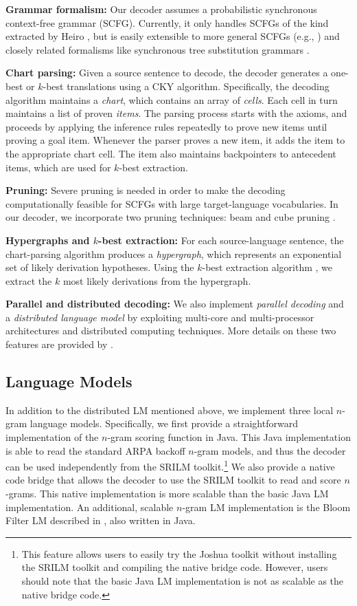 \documentclass[11pt]{article}
\begin{document}
\textbf{Grammar formalism:} Our decoder assumes a probabilistic synchronous context-free grammar (SCFG). Currently, it only handles SCFGs of the kind extracted by Heiro \cite{Chiang2007}, but is easily extensible to more general SCFGs (e.g., \cite{Galley2006}) and closely related formalisms like synchronous tree substitution grammars \cite{Eisner2003}.


\textbf{Chart parsing:} Given a source sentence to decode, the decoder generates a one-best or $k$-best translations using a CKY algorithm. Specifically,
the decoding algorithm  maintains a \emph{chart}, which contains an array of \emph{cells}. Each cell in turn maintains a list of proven \emph{items}. The parsing process starts with the axioms, and proceeds by applying the inference rules repeatedly to prove new items until proving a goal item. Whenever the parser proves a new item, it adds the item to the appropriate chart cell. The item also maintains backpointers to antecedent items, which are used for $k$-best extraction.

\textbf{Pruning:} Severe pruning is needed in order to make the decoding computationally feasible for SCFGs with large target-language vocabularies. In our decoder, we incorporate two pruning techniques: beam and cube pruning \cite{Chiang2007}.

\textbf{Hypergraphs and $k$-best extraction:}
For each source-language sentence, the chart-parsing algorithm produces a \emph{hypergraph}, which represents an exponential set of likely derivation hypotheses. Using the $k$-best extraction algorithm \cite{Huang2005}, we extract the $k$ most likely derivations from the hypergraph.

\textbf{Parallel and distributed decoding:}
We also implement \emph{parallel decoding} and a \emph{distributed language model} by exploiting multi-core and multi-processor architectures and distributed computing techniques. More details on these two features are provided by .

\subsection{Language Models}
In addition to the distributed LM mentioned above, we implement three local $n$-gram language models. Specifically, we first provide a straightforward implementation of the $n$-gram scoring function in Java. This Java implementation is able to read the standard ARPA backoff $n$-gram models, and thus the decoder can be used independently from the SRILM toolkit.\footnote{This feature allows users to easily try the Joshua toolkit without installing the SRILM toolkit and compiling the native bridge code. However, users should note that the basic Java LM implementation is not as scalable as the native bridge code.} We also provide a native code bridge that allows the decoder to use the SRILM toolkit to read and score $n$-grams. This native implementation is more scalable than the basic Java LM implementation. An additional, scalable $n$-gram LM implementation is the Bloom Filter LM described in , also written in Java.
\end{document}
